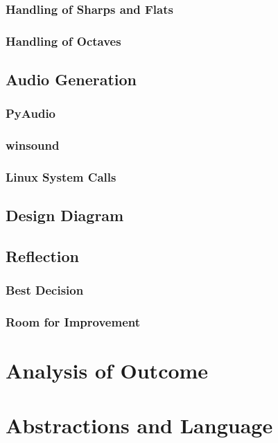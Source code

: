 \documentclass[10pt,letterpaper]{article}
\begin{document}
            \subsubsection{Handling of Sharps and Flats}
            \subsubsection{Handling of Octaves}

        \subsection{Audio Generation}
            \subsubsection{PyAudio}
            \subsubsection{winsound}
            \subsubsection{Linux System Calls}

        \subsection{Design Diagram}

        \subsection{Reflection}
            \subsubsection{Best Decision}
            \subsubsection{Room for Improvement}


    \section{Analysis of Outcome}


    \section{Abstractions and Language}
\end{document}
